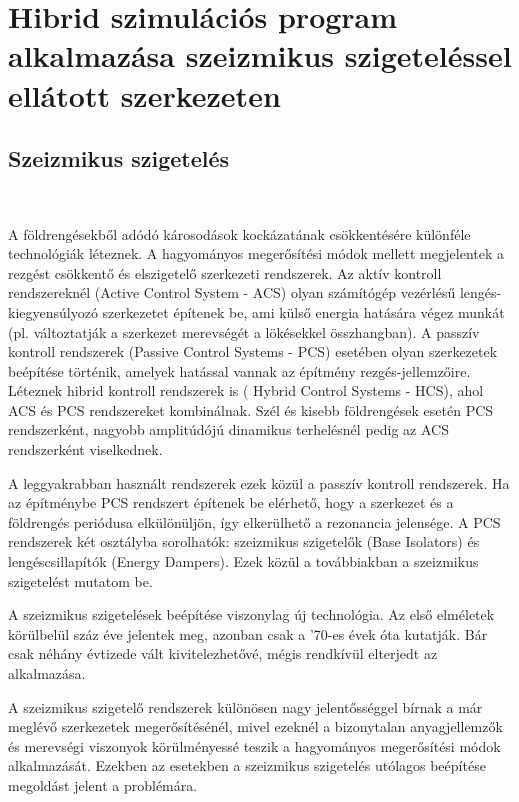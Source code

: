 \chapter[Hibrid szimulációs program alkalmazása]{Hibrid szimulációs program alkalmazása szeizmikus szigeteléssel ellátott szerkezeten}\label{chap: hibrid alk}

\section {Szeizmikus szigetelés}

{\ }

A földrengésekből adódó károsodások kockázatának csökkentésére különféle technológiák léteznek. A hagyományos megerősítési módok mellett megjelentek a  rezgést csökkentő és elszigetelő szerkezeti rendszerek. Az aktív kontroll rendszereknél (Active Control System - ACS) olyan számítógép vezérlésű lengés-kiegyensúlyozó szerkezetet építenek be, ami külső energia  hatására végez munkát (pl. változtatják a szerkezet merevségét a lökésekkel összhangban). A passzív kontroll rendszerek (Passive Control Systems - PCS) esetében  olyan szerkezetek beépítése történik, amelyek hatással vannak az építmény rezgés-jellemzőire. Léteznek hibrid kontroll rendszerek is ( Hybrid Control Systems - HCS), ahol ACS és PCS rendszereket kombinálnak. Szél és kisebb földrengések esetén PCS rendszerként, nagyobb amplitúdójú dinamikus terhelésnél pedig az ACS rendszerként viselkednek. 

A leggyakrabban használt rendszerek ezek közül a passzív kontroll rendszerek. Ha az építménybe PCS rendszert építenek be elérhető, hogy a  szerkezet és a földrengés periódusa elkülönüljön, így elkerülhető a rezonancia jelensége. A PCS rendszerek két osztályba sorolhatók: szeizmikus szigetelők (Base Isolators) és lengéscsillapítók (Energy Dampers). Ezek közül a továbbiakban a szeizmikus szigetelést mutatom be. 

A szeizmikus szigetelések beépítése viszonylag új technológia. Az első elméletek körülbelül száz éve jelentek meg, azonban  csak a '70-es évek óta  kutatják. Bár csak néhány évtizede vált kivitelezhetővé, mégis rendkívül  elterjedt az alkalmazása.

 A szeizmikus szigetelő rendszerek különösen nagy  jelentősséggel bírnak a már meglévő szerkezetek megerősítésénél, mivel ezeknél a bizonytalan anyagjellemzők és merevségi viszonyok körülményessé  teszik a hagyományos megerősítési módok alkalmazását. Ezekben az esetekben a szeizmikus szigetelés utólagos beépítése megoldást jelent a problémára.
 
